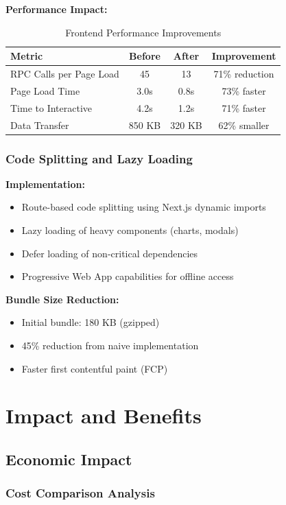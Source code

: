 \documentclass[a4paper,13pt,twoside]{report}
\theoremstyle{definition}
\begin{document}
\textbf{Performance Impact:}
\begin{table}[h]
\centering
\caption{Frontend Performance Improvements}
\begin{tabular}{|l|c|c|c|}
\hline
\textbf{Metric} & \textbf{Before} & \textbf{After} & \textbf{Improvement} \\
\hline
RPC Calls per Page Load & 45 & 13 & 71\% reduction \\
Page Load Time & 3.0s & 0.8s & 73\% faster \\
Time to Interactive & 4.2s & 1.2s & 71\% faster \\
Data Transfer & 850 KB & 320 KB & 62\% smaller \\
\hline
\end{tabular}
\end{table}

\subsubsection{Code Splitting and Lazy Loading}

\textbf{Implementation:}
\begin{itemize}
    \item Route-based code splitting using Next.js dynamic imports
    \item Lazy loading of heavy components (charts, modals)
    \item Defer loading of non-critical dependencies
    \item Progressive Web App capabilities for offline access
\end{itemize}

\textbf{Bundle Size Reduction:}
\begin{itemize}
    \item Initial bundle: 180 KB (gzipped)
    \item 45\% reduction from naive implementation
    \item Faster first contentful paint (FCP)
\end{itemize}

\section{Impact and Benefits}

\subsection{Economic Impact}

\subsubsection{Cost Comparison Analysis}
\end{document}
